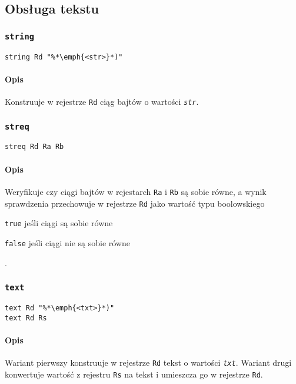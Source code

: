 \subsection{Obsługa tekstu}
\label{viua_vm_ops_text}

\subsubsection{\texttt{string}}

\begin{lstlisting}
string Rd "%*\emph{<str>}*)"
\end{lstlisting}

\paragraph*{Opis} Konstruuje w rejestrze \texttt{Rd} ciąg bajtów o wartości \emph{\texttt{str}}.

\subsubsection{\texttt{streq}}

\begin{lstlisting}
streq Rd Ra Rb
\end{lstlisting}

\paragraph*{Opis} Weryfikuje czy ciągi bajtów w rejestarch \texttt{Ra} i
\texttt{Rb} są sobie równe, a wynik sprawdzenia przechowuje w rejestrze
\texttt{Rd} jako wartość typu boolowskiego
\begin{enumerate*}[label=(\arabic*)]
    \item \texttt{true} jeśli ciągi są sobie równe
    \item \texttt{false} jeśli ciągi nie są sobie równe
\end{enumerate*}.

\subsubsection{\texttt{text}}

\begin{lstlisting}
text Rd "%*\emph{<txt>}*)"
text Rd Rs
\end{lstlisting}

\paragraph*{Opis} Wariant pierwszy konstruuje w rejestrze \texttt{Rd} tekst o wartości \emph{\texttt{txt}}.
Wariant drugi konwertuje wartość z rejestru \texttt{Rs} na tekst i umieszcza go w rejestrze \texttt{Rd}.

